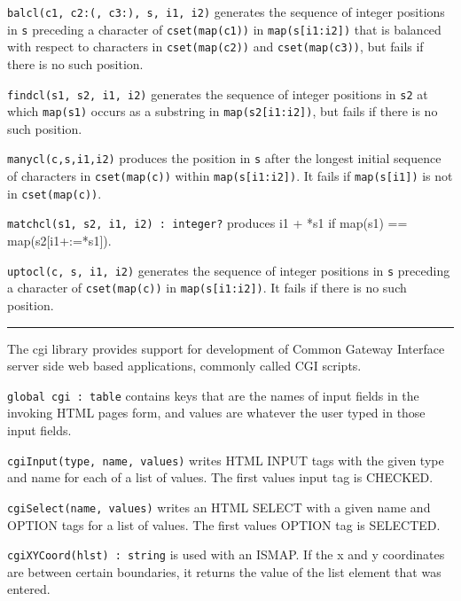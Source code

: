 \texttt{balcl(c1, c2:{\textquotesingle}({\textquotesingle},
c3:{\textquotesingle}){\textquotesingle}, s, i1, i2)} generates the
sequence of integer positions in \texttt{s} preceding a character of
\texttt{cset(map(c1))} in \texttt{map(s[i1:i2])} that is balanced with
respect to characters in \texttt{cset(map(c2))} and
\texttt{cset(map(c3))}, but fails if there is no such position.

\texttt{findcl(s1, s2, i1, i2)} generates the sequence of integer
positions in \texttt{s2} at which \texttt{map(s1)} occurs as a
substring in \texttt{map(s2[i1:i2])}, but fails if there is no such
position.

\texttt{manycl(c,s,i1,i2)} produces the position in \texttt{s} after the
longest initial sequence of characters in \texttt{cset(map(c))} within
\texttt{map(s[i1:i2])}. It fails if \texttt{map(s[i1])} is not in
\texttt{cset(map(c))}.

\texttt{matchcl(s1, s2, i1, i2) : integer?} produces i1 + *s1 if map(s1)
== map(s2[i1+:=*s1]).

\texttt{uptocl(c, s, i1, i2)} generates the sequence of integer
positions in \texttt{s} preceding a character of \texttt{cset(map(c))}
in \texttt{map(s[i1:i2])}. It fails if there is no such position.

\vspace{0.25cm}\hrule{}

The cgi library provides support for development of Common Gateway
Interface server side web based applications, commonly called
CGI scripts.

\texttt{global cgi : table} contains keys that are
the names of input fields in the invoking HTML page{\textquotesingle}s
form, and values are whatever the user typed in those input fields. 

\texttt{cgiInput(type, name, values)} writes HTML INPUT tags
with the given type and name for each of a list of
values. The first value{\textquotesingle}s input tag is CHECKED. 

\texttt{cgiSelect(name, values)} writes an HTML SELECT with a
given name and OPTION tags for a list of
values. The first value{\textquotesingle}s OPTION tag is SELECTED. 

\texttt{cgiXYCoord(hlst) : string} is used with an ISMAP.
If the x and y coordinates are between certain boundaries, it returns
the value of the list element that was entered. 

